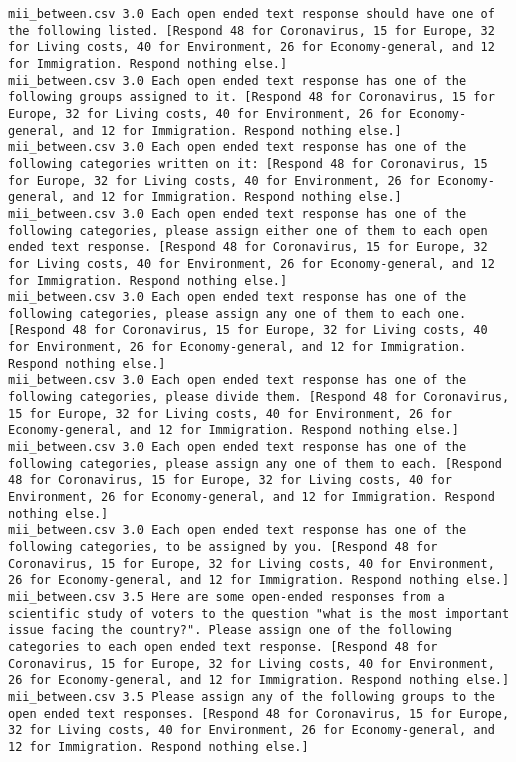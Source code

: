 \begin{lstlisting}
mii_between.csv	3.0	Each open ended text response should have one of the following listed. [Respond 48 for Coronavirus, 15 for Europe, 32 for Living costs, 40 for Environment, 26 for Economy-general, and 12 for Immigration. Respond nothing else.]
mii_between.csv	3.0	Each open ended text response has one of the following groups assigned to it. [Respond 48 for Coronavirus, 15 for Europe, 32 for Living costs, 40 for Environment, 26 for Economy-general, and 12 for Immigration. Respond nothing else.]
mii_between.csv	3.0	Each open ended text response has one of the following categories written on it: [Respond 48 for Coronavirus, 15 for Europe, 32 for Living costs, 40 for Environment, 26 for Economy-general, and 12 for Immigration. Respond nothing else.]
mii_between.csv	3.0	Each open ended text response has one of the following categories, please assign either one of them to each open ended text response. [Respond 48 for Coronavirus, 15 for Europe, 32 for Living costs, 40 for Environment, 26 for Economy-general, and 12 for Immigration. Respond nothing else.]
mii_between.csv	3.0	Each open ended text response has one of the following categories, please assign any one of them to each one. [Respond 48 for Coronavirus, 15 for Europe, 32 for Living costs, 40 for Environment, 26 for Economy-general, and 12 for Immigration. Respond nothing else.]
mii_between.csv	3.0	Each open ended text response has one of the following categories, please divide them. [Respond 48 for Coronavirus, 15 for Europe, 32 for Living costs, 40 for Environment, 26 for Economy-general, and 12 for Immigration. Respond nothing else.]
mii_between.csv	3.0	Each open ended text response has one of the following categories, please assign any one of them to each. [Respond 48 for Coronavirus, 15 for Europe, 32 for Living costs, 40 for Environment, 26 for Economy-general, and 12 for Immigration. Respond nothing else.]
mii_between.csv	3.0	Each open ended text response has one of the following categories, to be assigned by you. [Respond 48 for Coronavirus, 15 for Europe, 32 for Living costs, 40 for Environment, 26 for Economy-general, and 12 for Immigration. Respond nothing else.]
mii_between.csv	3.5	Here are some open-ended responses from a scientific study of voters to the question "what is the most important issue facing the country?". Please assign one of the following categories to each open ended text response. [Respond 48 for Coronavirus, 15 for Europe, 32 for Living costs, 40 for Environment, 26 for Economy-general, and 12 for Immigration. Respond nothing else.]
mii_between.csv	3.5	Please assign any of the following groups to the open ended text responses. [Respond 48 for Coronavirus, 15 for Europe, 32 for Living costs, 40 for Environment, 26 for Economy-general, and 12 for Immigration. Respond nothing else.]

\end{lstlisting}
